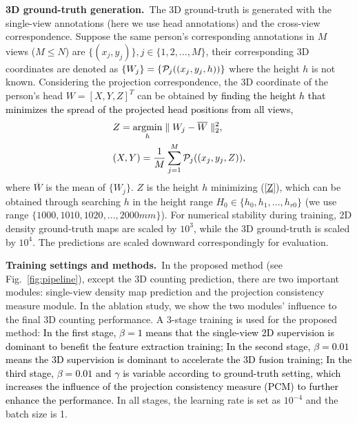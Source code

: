 \documentclass[letterpaper]{article} %
\newcommand{\abc}[1]{\textcolor{black}{#1}}
\newcommand{\zq}[1]{\textcolor{black}{#1}} %
\begin{document}
\textbf{3D ground-truth generation.}~The 3D ground-truth is generated with the single-view annotations (here we use head annotations) and the cross-view correspondence. Suppose the same person's corresponding annotations in $M$ views ($M$$\leq$$N$) are $\{(x_j, y_j)\}, j\in\{1, 2, ..., M\}$, their corresponding 3D coordinates are denoted as $\{W_j\} = \{{{\cal P}_j}((x_j, y_j, h))\}$ where the height $h$ is not known. Considering the projection correspondence, the 3D coordinate of the person's head $W=[X, Y, Z]^T$ can be obtained \abc{by finding the height $h$ that minimizes the spread of the projected head positions from all views,}
\begin{align}
     &Z = \mathop{\mathrm{argmin}}_h \parallel W_j - \overline{W} \parallel^2_2, \label{Z} \\
     &(X, Y) = \frac{1}{M}\sum^M_{j=1}{{\cal P}_j}((x_j, y_j, Z)), \label{X_Y}
\end{align}
where $\overline{W}$ is the mean of $\{W_j\}$. $Z$ is the height $h$ minimizing (\ref{Z}), which can be obtained through searching $h$ in the height range $H_0 \in \{h_0, h_1, ..., h_{r0}\}$ (we use range $\{1000, 1010, 1020, ... , 2000 mm\}$). %
For numerical stability during training, 2D density  ground-truth maps are scaled by $10^3$,  while the 3D ground-truth is scaled by $10^4$.
The predictions are scaled downward correspondingly for evaluation.


\textbf{Training settings and methods.}~In the proposed method (see Fig.~\ref{fig:pipeline}), except the 3D counting prediction, there are two important modules: single-view density map prediction and the projection consistency measure module. In the ablation study, we show the two modules' influence to the final 3D counting performance.
A 3-stage training is used for the proposed method:
\zq{In the first stage, $\beta=1$ means that the single-view 2D supervision is dominant to benefit the feature extraction training; In the second stage, $\beta=0.01$ means the 3D supervision is dominant  to accelerate the 3D fusion training; In the third stage,  $\beta=0.01$ and
$\gamma$ is variable according to ground-truth setting,
which increases the influence of the projection consistency measure (PCM)  %
to further enhance the performance.} In all stages, the learning rate is set as $10^{-4}$ and the batch size is 1.
\end{document}

